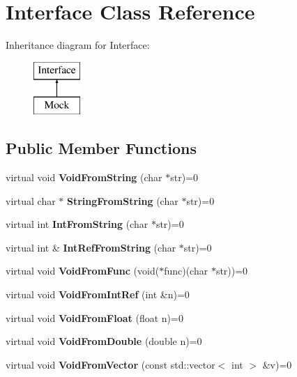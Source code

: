 \hypertarget{classInterface}{}\section{Interface Class Reference}
\label{classInterface}
Inheritance diagram for Interface\+:\begin{figure}[H]
\begin{center}
\leavevmode
\includegraphics[height=2.000000cm]{classInterface}
\end{center}
\end{figure}
\subsection*{Public Member Functions}
\begin{DoxyCompactItemize}
\item 
\mbox{\label{classInterface_a65d6ae604e7e9a513aec72c9c94e0b97}} 
virtual void {\bfseries Void\+From\+String} (char $\ast$str)=0
\item 
\mbox{\label{classInterface_a756b1d22c12aa3f14a5083f90043fbf0}} 
virtual char $\ast$ {\bfseries String\+From\+String} (char $\ast$str)=0
\item 
\mbox{\label{classInterface_ab34c8a5fd2236a6b009f86a4e5851b61}} 
virtual int {\bfseries Int\+From\+String} (char $\ast$str)=0
\item 
\mbox{\label{classInterface_ab93276de67e60c44fd775d4c139aa8e1}} 
virtual int \& {\bfseries Int\+Ref\+From\+String} (char $\ast$str)=0
\item 
\mbox{\label{classInterface_a7dab3c82b857a9a5f52b3ce6f7df547f}} 
virtual void {\bfseries Void\+From\+Func} (void($\ast$func)(char $\ast$str))=0
\item 
\mbox{\label{classInterface_aa43fb56650a57b6b3e7743e54e50cb86}} 
virtual void {\bfseries Void\+From\+Int\+Ref} (int \&n)=0
\item 
\mbox{\label{classInterface_ae2b3e9411c893a45642d3af632752c66}} 
virtual void {\bfseries Void\+From\+Float} (float n)=0
\item 
\mbox{\label{classInterface_aa56524017aabdbe46510648c711ab8a8}} 
virtual void {\bfseries Void\+From\+Double} (double n)=0
\item 
\mbox{\label{classInterface_ae84fe7e53f881db2f823ad35d004927a}} 
virtual void {\bfseries Void\+From\+Vector} (const std\+::vector$<$ int $>$ \&v)=0
\end{DoxyCompactItemize}


